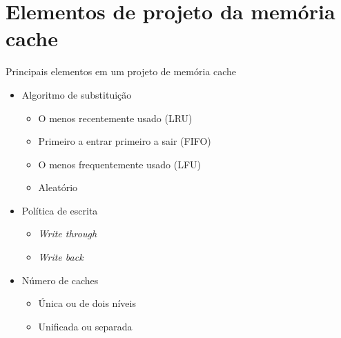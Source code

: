 \section[slide=true]{Elementos de projeto da memória cache}
\begin{slide}{Principais elementos em um projeto de memória cache}
	{
	\begin{itemize}
		\item Algoritmo de substituição
			\begin{itemize}
				\item O menos recentemente usado (LRU)
				\item Primeiro a entrar primeiro a sair (FIFO)
				\item O menos frequentemente usado (LFU)
				\item Aleatório
			\end{itemize}
		\item Política de escrita
			\begin{itemize}
				\item \emph{Write through}
				\item \emph{Write back}
			\end{itemize} 
		\item Número de caches
			\begin{itemize}
				\item Única ou de dois níveis
				\item Unificada ou separada
			\end{itemize}
	\end{itemize}
	}
\end{slide}

